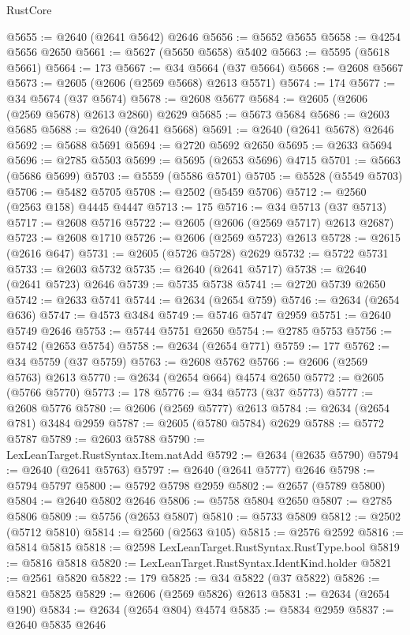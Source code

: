 \begin{lexlean}{RustCore}
\begin{coremodule}
@5655 := @2640 (@2641 @5642) @2646
@5656 := @5652 @5655
@5658 := @4254 @5656 @2650
@5661 := @5627 (@5650 @5658) @5402
@5663 := @5595 (@5618 @5661)
@5664 := 173
@5667 := @34 @5664 (@37 @5664)
@5668 := @2608 @5667
@5673 := @2605 (@2606 (@2569 @5668) @2613 @5571)
@5674 := 174
@5677 := @34 @5674 (@37 @5674)
@5678 := @2608 @5677
@5684 := @2605 (@2606 (@2569 @5678) @2613 @2860) @2629
@5685 := @5673 @5684
@5686 := @2603 @5685
@5688 := @2640 (@2641 @5668)
@5691 := @2640 (@2641 @5678) @2646
@5692 := @5688 @5691
@5694 := @2720 @5692 @2650
@5695 := @2633 @5694
@5696 := @2785 @5503
@5699 := @5695 (@2653 @5696) @4715
@5701 := @5663 (@5686 @5699)
@5703 := @5559 (@5586 @5701)
@5705 := @5528 (@5549 @5703)
@5706 := @5482 @5705
@5708 := @2502 (@5459 @5706)
@5712 := @2560 (@2563 @158) @4445 @4447
@5713 := 175
@5716 := @34 @5713 (@37 @5713)
@5717 := @2608 @5716
@5722 := @2605 (@2606 (@2569 @5717) @2613 @2687)
@5723 := @2608 @1710
@5726 := @2606 (@2569 @5723) @2613
@5728 := @2615 (@2616 @647)
@5731 := @2605 (@5726 @5728) @2629
@5732 := @5722 @5731
@5733 := @2603 @5732
@5735 := @2640 (@2641 @5717)
@5738 := @2640 (@2641 @5723) @2646
@5739 := @5735 @5738
@5741 := @2720 @5739 @2650
@5742 := @2633 @5741
@5744 := @2634 (@2654 @759)
@5746 := @2634 (@2654 @636)
@5747 := @4573 @3484
@5749 := @5746 @5747 @2959
@5751 := @2640 @5749 @2646
@5753 := @5744 @5751 @2650
@5754 := @2785 @5753
@5756 := @5742 (@2653 @5754)
@5758 := @2634 (@2654 @771)
@5759 := 177
@5762 := @34 @5759 (@37 @5759)
@5763 := @2608 @5762
@5766 := @2606 (@2569 @5763) @2613
@5770 := @2634 (@2654 @664) @4574 @2650
@5772 := @2605 (@5766 @5770)
@5773 := 178
@5776 := @34 @5773 (@37 @5773)
@5777 := @2608 @5776
@5780 := @2606 (@2569 @5777) @2613
@5784 := @2634 (@2654 @781) @3484 @2959
@5787 := @2605 (@5780 @5784) @2629
@5788 := @5772 @5787
@5789 := @2603 @5788
@5790 := LexLeanTarget.RustSyntax.Item.natAdd
@5792 := @2634 (@2635 @5790)
@5794 := @2640 (@2641 @5763)
@5797 := @2640 (@2641 @5777) @2646
@5798 := @5794 @5797
@5800 := @5792 @5798 @2959
@5802 := @2657 (@5789 @5800)
@5804 := @2640 @5802 @2646
@5806 := @5758 @5804 @2650
@5807 := @2785 @5806
@5809 := @5756 (@2653 @5807)
@5810 := @5733 @5809
@5812 := @2502 (@5712 @5810)
@5814 := @2560 (@2563 @105)
@5815 := @2576 @2592
@5816 := @5814 @5815
@5818 := @2598 LexLeanTarget.RustSyntax.RustType.bool
@5819 := @5816 @5818
@5820 := LexLeanTarget.RustSyntax.IdentKind.holder
@5821 := @2561 @5820
@5822 := 179
@5825 := @34 @5822 (@37 @5822)
@5826 := @5821 @5825
@5829 := @2606 (@2569 @5826) @2613
@5831 := @2634 (@2654 @190)
@5834 := @2634 (@2654 @804) @4574
@5835 := @5834 @2959
@5837 := @2640 @5835 @2646

\end{coremodule}
\end{lexlean}
